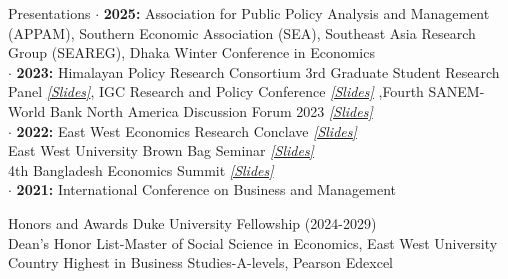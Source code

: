 \documentclass[
	9pt %
]{resume} %
\begin{document}

\vspace{-10pt}
\begin{rSection}{Presentations} 
	$\cdot$ \textbf{2025:} Association for Public Policy Analysis and Management (APPAM), Southern Economic Association (SEA), Southeast Asia Research Group (SEAREG), Dhaka Winter Conference in Economics \\
	$\cdot$ \textbf{2023:} Himalayan Policy Research Consortium 3rd Graduate Student Research Panel \textit{\href{https://drive.google.com/file/d/1c9OJ8KnxRb3NdGvUFLuZDAEZU23Q6XjM/view?usp=sharing}{[Slides]}}, IGC Research and Policy Conference \textit{\href{https://drive.google.com/file/d/1tcRIY8yxC01FdsVJsKmR4vaRdW0Yn3bb/view?usp=sharing}{[Slides]}} ,Fourth SANEM-World Bank North America Discussion Forum 2023 \textit{\href{https://drive.google.com/file/d/1qjbrjKkHRWeoh3wKIsvkR1mJkWT9Fw9N/view?usp=sharing}{[Slides]}}  \\
	$\cdot$ \textbf{2022:}  East West Economics Research Conclave  \textit{\href{https://drive.google.com/file/d/1TUbtHcgI-sgZE9GFSnNAmb4yfXD8yjDS/view?usp=sharing}{[Slides]}}  \\ 
	East West University Brown Bag Seminar \textit{\href{https://drive.google.com/file/d/1tOFNpG46qjF2K_2QMGyzyqxcxz4gJK2q/view?usp=sharing}{[Slides]}}  \\ 
	4th Bangladesh Economics Summit \textit{\href{https://drive.google.com/file/d/1tmlU19aaJJR7mLwPncVduP_Gg7TQjVrH/view?usp=sharing}{[Slides]}}  \\ 
	$\cdot$ \textbf{2021:} International Conference on Business and Management
\end{rSection}


\vspace{-6pt}
\begin{rSection}{Honors and Awards} 
	Duke University Fellowship (2024-2029) \\
	Dean's Honor List-Master of Social Science in Economics, East West University \\
	Country Highest in Business Studies-A-levels, Pearson Edexcel
\end{rSection}
\end{document}
